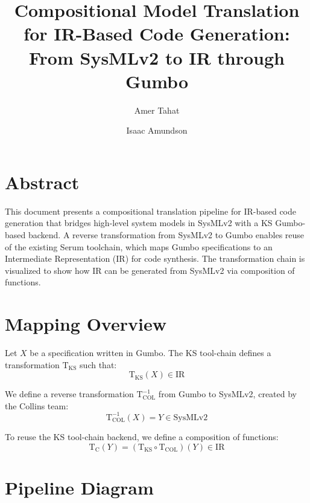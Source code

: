 \documentclass{article}
\title{%
Compositional Model Translation for IR-Based Code Generation: From SysMLv2 to IR through Gumbo}
\author{Amer Tahat \and Isaac Amundson}
\date{}
\begin{document}
\maketitle

\section*{Abstract}
This document presents a compositional translation pipeline for IR-based code generation that bridges high-level system models in SysMLv2 with a KS Gumbo-based backend. A reverse transformation from SysMLv2 to Gumbo enables reuse of the existing Serum toolchain, which maps Gumbo specifications to an Intermediate Representation (IR) for code synthesis. The transformation chain is visualized to show how IR can be generated from SysMLv2 via composition of functions.

\section*{Mapping Overview}
Let $X$ be a specification written in Gumbo. The KS tool-chain defines a transformation $\mathrm{T}_{\mathrm{KS}}$ such that:
\begin{equation*}
    \mathrm{T}_{\mathrm{KS}}(X) \in \text{IR}
\end{equation*}

We define a reverse transformation $\mathrm{T}^{-1}_{\mathrm{COL}}$ from Gumbo to SysMLv2, created by the Collins team:
\begin{equation*}
    \mathrm{T}^{-1}_{\mathrm{COL}}(X) = Y \in \text{SysMLv2}
\end{equation*}

To reuse the KS tool-chain backend, we define a composition of functions:
\begin{equation*}
    \mathrm{T}_{\mathrm{C}}(Y) = \left( \mathrm{T}_{\mathrm{KS}} \circ \mathrm{T}_{\mathrm{COL}} \right)(Y) \in \text{IR}
\end{equation*}

\section*{Pipeline Diagram}

\begin{center}
\end{center}
\end{document}
